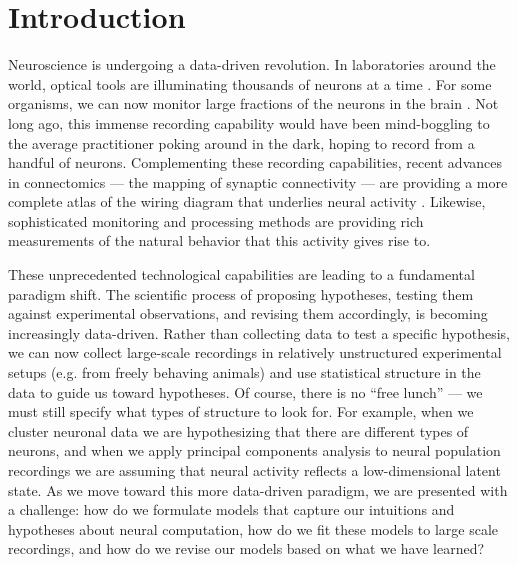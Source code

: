 \chapter{Introduction}
\label{chap:one}

Neuroscience is undergoing a data-driven revolution.  In
laboratories around the world, optical tools are illuminating
thousands of neurons at a time \citep{kerr2008imaging}.
For some organisms, we can now monitor large fractions of the neurons
in the brain \citep{ahrens2013whole, prevedel2014simultaneous,
  lemon2015whole}.  Not long ago, this immense recording capability
would have been mind-boggling to the average practitioner poking
around in the dark, hoping to record from a handful of neurons.
Complementing these recording capabilities, recent advances in
connectomics --- the mapping of synaptic connectivity
\citep{sporns2005human} --- are providing a more complete atlas of the
wiring diagram that underlies neural activity
\citep{lichtman2008technicolour, helmstaedter2013connectomic,
  oh2014mesoscale}.  Likewise, sophisticated monitoring and processing
methods \citep[e.g.][]{berman2014mapping, wiltschko2015mapping} are providing rich
measurements of the natural behavior that this activity gives rise to.

These unprecedented technological
capabilities are leading to a fundamental paradigm shift.
The scientific process of proposing hypotheses, testing them against
experimental observations, and revising them accordingly, is becoming increasingly
data-driven.  Rather than collecting data to test a specific
hypothesis, we can now collect large-scale recordings in relatively
unstructured experimental setups (e.g. from freely behaving animals)
and use statistical structure in the data to guide us toward 
hypotheses. Of course, there is no ``free lunch'' --- we must still
specify what types of structure to look for. For
example, when we cluster neuronal data we are hypothesizing
that there are different types of neurons, and when we apply principal
components analysis to neural population recordings we are 
assuming that neural activity reflects a low-dimensional latent state.
As we move toward this more data-driven paradigm, we are presented
with a challenge: how do we formulate models that capture
our intuitions and hypotheses about neural computation, how do we
fit these models to large scale recordings, and how do we revise 
our models based on what we have learned?

